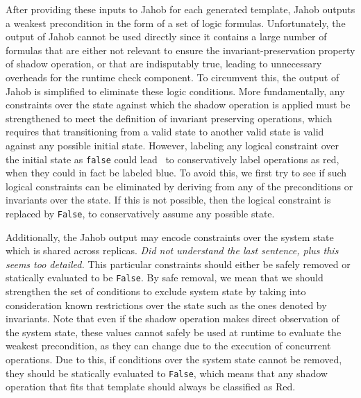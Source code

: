 After providing these inputs to Jahob for each generated template, Jahob outputs a weakest precondition in the form of a set of logic formulas. 
Unfortunately, the output of Jahob cannot be used directly since it contains a large number
of formulas that are either not relevant to ensure the invariant-preservation property of shadow operation, or that are indisputably true, leading
to unnecessary overheads for the runtime check component. To circumvent this, the output of Jahob
is simplified to eliminate these logic conditions.
More fundamentally, any constraints over the state against which the shadow operation
is applied must be strengthened to meet the definition of invariant
preserving operations, which requires that transitioning
from a valid state to another valid state is valid against any
possible initial state.
However, labeling any logical constraint over the initial state as \texttt{false} could lead
\tool\ to conservatively label operations as red, when they could in fact be labeled blue. To avoid this,
we first try to see if such logical constraints can be eliminated by deriving from any of the
preconditions or invariants over the state. If this is not possible, then the logical constraint is replaced by \texttt{False}, to conservatively assume any possible state.

 Additionally, the Jahob output 
may encode constraints over the system state which is shared across replicas. {\em Did not understand the last sentence, plus this seems too detailed.} This particular
constraints should either be safely removed or statically evaluated to be \texttt{False}. By safe
removal, we mean that we should strengthen the set of conditions to exclude system state by
taking into consideration known restrictions over the state such as the ones denoted by invariants. 
Note that even if the shadow operation makes direct observation of the system state, these values 
cannot safely be used at runtime to evaluate the weakest precondition, as they can change due to 
the execution of concurrent operations. Due to this, if conditions over the system state cannot be
removed, they should be statically evaluated to \texttt{False}, which means that any shadow operation
that fits that template should always be classified as Red.
\fi

